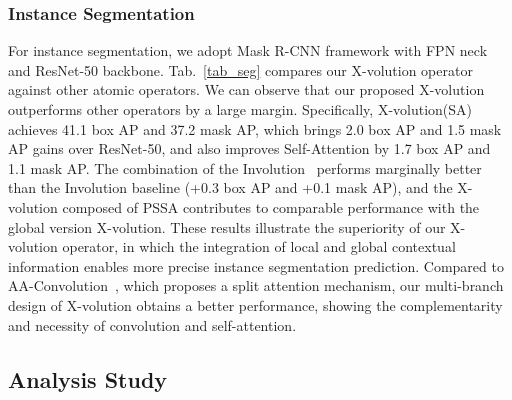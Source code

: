 \documentclass{article}
\begin{document}
\subsubsection{Instance Segmentation}
For instance segmentation, we adopt Mask R-CNN framework with FPN neck and ResNet-50 backbone. Tab.~\ref{tab_seg} compares our X-volution operator against other atomic operators. We can observe that our proposed X-volution outperforms other operators by a large margin. Specifically, X-volution(SA) achieves 41.1 box AP and 37.2 mask AP, which brings 2.0 box AP and 1.5 mask AP gains over ResNet-50, and also improves Self-Attention by 1.7 box AP and 1.1 mask AP. The combination of the Involution~\cite{DBLP:journals/corr/abs-2103-06255} performs marginally better than the Involution baseline (+0.3 box AP and +0.1 mask AP), and the X-volution composed of PSSA contributes to comparable performance with the global version X-volution.
These results illustrate the superiority of our X-volution operator, in which the integration of local and global contextual information enables more precise instance segmentation prediction. 
Compared to AA-Convolution~\cite{DBLP:conf/iccv/BelloZLVS19}, which proposes a split attention mechanism, our multi-branch design of X-volution obtains a better performance, showing the complementarity and necessity of convolution and self-attention.










\subsection{Analysis Study}
\end{document}
